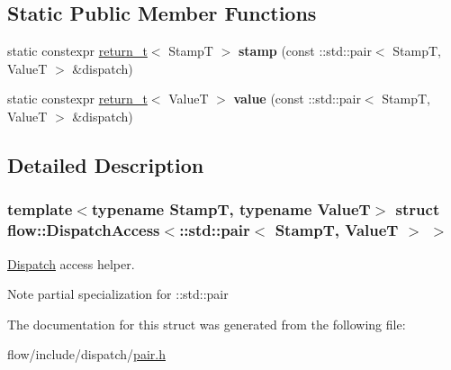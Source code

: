 \subsection*{Static Public Member Functions}
\begin{DoxyCompactItemize}
\item 
\mbox{\label{structflow_1_1_dispatch_access_3_1_1std_1_1pair_3_01_stamp_t_00_01_value_t_01_4_01_4_a2065a3aba8aad9ea19bf85001f289adb}} 
static constexpr \hyperlink{structflow_1_1_dispatch_access_3_1_1std_1_1pair_3_01_stamp_t_00_01_value_t_01_4_01_4_a4d69ceeba753574e80855ee3dc1ffbb4}{return\+\_\+t}$<$ StampT $>$ {\bfseries stamp} (const \+::std\+::pair$<$ StampT, ValueT $>$ \&dispatch)
\item 
\mbox{\label{structflow_1_1_dispatch_access_3_1_1std_1_1pair_3_01_stamp_t_00_01_value_t_01_4_01_4_aefbb81619ec6bafdc65a94048e4ea37c}} 
static constexpr \hyperlink{structflow_1_1_dispatch_access_3_1_1std_1_1pair_3_01_stamp_t_00_01_value_t_01_4_01_4_a4d69ceeba753574e80855ee3dc1ffbb4}{return\+\_\+t}$<$ ValueT $>$ {\bfseries value} (const \+::std\+::pair$<$ StampT, ValueT $>$ \&dispatch)
\end{DoxyCompactItemize}


\subsection{Detailed Description}
\subsubsection*{template$<$typename StampT, typename ValueT$>$\newline
struct flow\+::\+Dispatch\+Access$<$\+::std\+::pair$<$ Stamp\+T, Value\+T $>$ $>$}

\hyperlink{classflow_1_1_dispatch}{Dispatch} access helper. 

\begin{DoxyNote}{Note}
partial specialization for {\ttfamily \+::std\+::pair} 
\end{DoxyNote}


The documentation for this struct was generated from the following file\+:\begin{DoxyCompactItemize}
\item 
flow/include/dispatch/\hyperlink{pair_8h}{pair.\+h}\end{DoxyCompactItemize}
